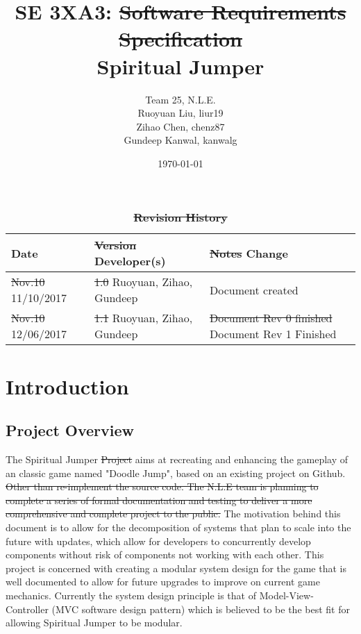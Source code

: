 \documentclass[12pt, titlepage]{article}
\title{SE 3XA3: \sout{Software Requirements Specification} \rev{\\Module Guide}\\Spiritual Jumper}
\author{Team 25, N.L.E.
		\\ Ruoyuan Liu, liur19
		\\ Zihao Chen, chenz87
		\\ Gundeep Kanwal, kanwalg
}
\date{\today}
\newcommand{\rev}[1]{\textcolor{RevisionColour}{#1}}
\begin{document}
\maketitle
{}
\tableofcontents
\listoftables
\listoffigures


\begin{table}[tp]
\caption{\sout{\bf Revision History}}
\begin{tabularx}{\textwidth}{p{3cm}p{2cm}X}
\toprule {\bf Date} & \sout{\bf Version} \rev{\textbf{Developer(s)}} & \sout{\bf Notes} \rev{\textbf{Change}}\\
\midrule
\sout{Nov.10} \rev{11/10/2017} & \sout{1.0} \rev{Ruoyuan, Zihao, Gundeep} & Document created\\
\sout{Nov.10} \rev{12/06/2017} & \sout{1.1} \rev{Ruoyuan, Zihao, Gundeep} & \sout{Document Rev 0 finished} \rev{Document Rev 1 Finished}\\
\bottomrule
\end{tabularx}
\end{table}

\newpage

\section{Introduction}\label{SecIntro}
\subsection{Project Overview}
The Spiritual Jumper \sout{Project} aims at recreating and enhancing the gameplay of an classic game named "Doodle Jump", based on an existing project on Github. \sout{Other than re-implement the source code. The N.L.E team is planning to complete a series of formal documentation and testing to deliver a more comprehensive and complete project to the public.} \rev{The motivation behind this document is to allow for the decomposition of systems that plan to scale into the future with updates, which allow for developers to concurrently develop components without risk of components not working with each other. This project is concerned with creating a modular system design for the game that is well documented to allow for future upgrades to improve on current game mechanics. Currently the system design principle is that of Model-View-Controller (MVC software design pattern) which is believed to be the best fit for allowing Spiritual Jumper to be modular.}
\end{document}
